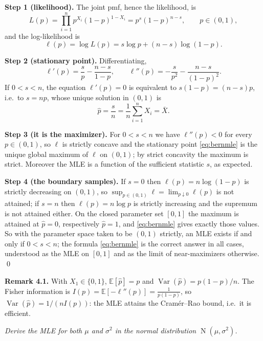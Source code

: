 \documentclass{MFM-hw} %
\newcommand{\normal}{\operatorname{N}}
\newcommand{\E}{\mathbb{E}}
\newcommand{\Var}{\operatorname{Var}}
\begin{document}
\smallskip
\noindent\textbf{Step 1 (likelihood).} The joint pmf, hence the likelihood, is
\[
    L(p)=\prod_{i=1}^n p^{X_i}(1-p)^{1-X_i}=p^{s}(1-p)^{n-s},\qquad p\in(0,1),
\]
and the log-likelihood is
\begin{equation}\label{eq:bern}
    \ell(p)=\log L(p)=s\log p+(n-s)\log(1-p).
\end{equation}

\smallskip
\noindent\textbf{Step 2 (stationary point).} Differentiating,
\[
    \ell'(p)=\frac{s}{p}-\frac{n-s}{1-p},\qquad
    \ell''(p)=-\frac{s}{p^2}-\frac{n-s}{(1-p)^2}.
\]
If $0<s<n$, the equation $\ell'(p)=0$ is equivalent to $s(1-p)=(n-s)p$, i.e.\ to $s=np$, whose unique solution in $(0,1)$ is
\begin{equation}\label{eq:bernmle}
    \boxed{\;\hat p=\frac{s}{n}=\frac1n\sum_{i=1}^nX_i=\bar X.\;}
\end{equation}

\smallskip
\noindent\textbf{Step 3 (it is the maximizer).} For $0<s<n$ we have $\ell''(p)<0$ for every $p\in(0,1)$, so $\ell$ is strictly concave and the stationary point \eqref{eq:bernmle} is the unique global maximum of $\ell$ on $(0,1)$; by strict concavity the maximum is strict. Moreover the MLE is a function of the sufficient statistic $s$, as expected.

\smallskip
\noindent\textbf{Step 4 (the boundary samples).} If $s=0$ then $\ell(p)=n\log(1-p)$ is strictly decreasing on $(0,1)$, so $\sup_{p\in(0,1)}\ell=\lim_{p\downarrow0}\ell(p)$ is not attained; if $s=n$ then $\ell(p)=n\log p$ is strictly increasing and the supremum is not attained either. On the closed parameter set $[0,1]$ the maximum is attained at $\hat p=0$, respectively $\hat p=1$, and \eqref{eq:bernmle} gives exactly those values. So with the parameter space taken to be $(0,1)$ strictly, an MLE exists if and only if $0<s<n$; the formula \eqref{eq:bernmle} is the correct answer in all cases, understood as the MLE on $[0,1]$ and as the limit of near-maximizers otherwise. \qed

\smallskip
\noindent\textbf{Remark 4.1.} With $X_1\in\{0,1\}$, $\E[\hat p]=p$ and $\Var(\hat p)=p(1-p)/n$. The Fisher information is $I(p)=\E[-\ell''(p)]=\frac{1}{p(1-p)}$, so $\Var(\hat p)=1/(nI(p))$: the MLE attains the Cram\'er--Rao bound, i.e.\ it is efficient.

\HWproblem
\noindent\textit{Derive the MLE for both $\mu$ and $\sigma^2$ in the normal distribution $\normal(\mu,\sigma^2)$.}
\end{document}
